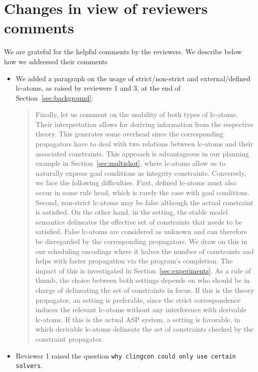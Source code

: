 
\section{Changes in view of reviewers comments}
\label{sec:changes}

We are grateful for the helpful comments by the reviewers.
We describe below how we addressed their comments

\begin{itemize}
\item 
We added a paragraph on the usage of strict/non-strict and external/defined lc-atoms, as raised by reviewers 1 and 3,
at the end of Section~\ref{sec:background}:

\begin{quote}
Finally, let us comment on the usability of both types of lc-atoms.
%
Their  interpretation allows for deriving information from the respective theory.
This generates some overhead since the corresponding propagators have to deal with
two relations between lc-atoms and their associated constraints.
%
This approach is advantageous in our planning example in Section~\ref{sec:multishot}, 
where  lc-atoms allow us 
to naturally express goal conditions as integrity constraints.
Conversely, we face the following difficulties.
First, defined lc-atoms must also occur in some rule head, which is rarely the case with goal conditions.
Second, non-strict lc-atoms may be false although the actual constraint is satisfied.
%
On the other hand, 
in the  setting,
the stable model semantics delineates the effective set of constraints that needs to be satisfied.
False lc-atoms are considered as unknown and can therefore be disregarded by the corresponding propagators.
We draw on this in our scheduling encodings where it halves the number of constraints and helps with faster propagation via the program's completion.
The impact of this is investigated in Section~\ref{sec:experiments}.
%
As a rule of thumb,
the choice between both settings depends on who should be in charge of delineating the set of constraints in focus.
If this is the theory propagator, an  setting is preferable,
since the strict correspondence induces the relevant lc-atoms without any interference with derivable lc-atoms.
If this is the actual ASP system, a  setting is favorable,
in which derivable lc-atoms delineate the set of constraints checked by the constraint propagator.
\end{quote}
\item Reviewer 1 raised the question \texttt{why clingcon could only use certain solvers}.


\end{itemize}
